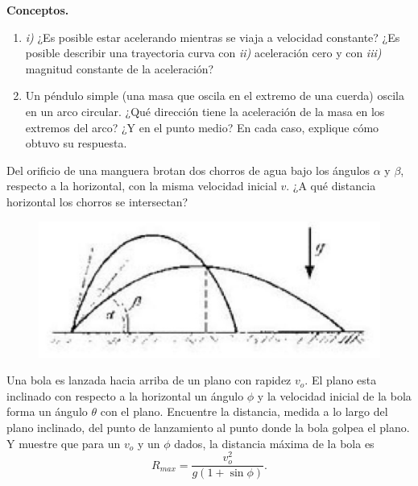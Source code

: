 \begin{mdframed}[style=warning]
	\begin{ejercicio}
		\textbf{Conceptos.}
		\begin{enumerate}
			\item \textit{i)} ¿Es posible estar acelerando mientras se viaja a velocidad constante? ¿Es posible describir una trayectoria curva con \textit{ii)} aceleración cero y con \textit{iii)} magnitud constante de la aceleración?
			\item Un péndulo simple (una masa que oscila en el extremo de una cuerda) oscila en un arco circular. ¿Qué dirección tiene la aceleración de la masa en los extremos del arco? ¿Y en el punto medio? En cada caso, explique cómo obtuvo su respuesta.
		\end{enumerate}
	\end{ejercicio}
\end{mdframed}









\begin{mdframed}[style=warning]
	\begin{ejercicio}
		Del orificio de una manguera brotan dos chorros de agua bajo los ángulos $\alpha$ y $\beta$, respecto a la horizontal, con la misma velocidad inicial $v$. ¿A qué distancia horizontal los chorros se intersectan?
		\begin{figure}[H]
			\centering
			\includegraphics[scale=0.3]{./img/chorros.png}
		\end{figure}
	\end{ejercicio}
\end{mdframed}








\begin{mdframed}[style=warning]
	\begin{ejercicio}
		Una bola es lanzada hacia arriba de un plano con rapidez $v_o$. El plano esta inclinado con respecto a la horizontal un ángulo $\phi$ y la velocidad inicial de la bola forma un ángulo $\theta$ con el plano. Encuentre la distancia, medida a lo largo del plano inclinado, del punto de lanzamiento al punto donde la bola golpea el plano. Y muestre que para un $v_o$ y un $\phi$ dados, la distancia máxima de la bola es
			$$ R_{max} = \frac{v_o ^2}{g(1 + \sin{\phi})}. $$
	\end{ejercicio}
\end{mdframed}







